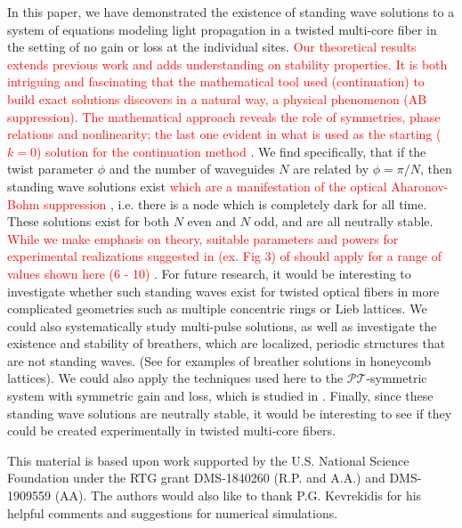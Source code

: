 \documentclass[reprint, amsmath,amssymb,aps,pra]{revtex4-2}
\newcommand{\revision}[1]{ \textcolor{red}{#1} }
\begin{document}
In this paper, we have demonstrated the existence of standing wave solutions to a system of equations modeling light propagation in a twisted multi-core fiber in the setting of no gain or loss at the individual sites. \revision{Our theoretical results extends previous work and adds understanding on stability properties. It is both intriguing and fascinating that the mathematical tool used (continuation) to build exact solutions discovers in a natural way, a physical phenomenon (AB suppression). The mathematical approach reveals the role of symmetries, phase relations and nonlinearity; the last one evident in what is used as the starting ($k=0$) solution for the continuation method}. We find specifically, that if the twist parameter $\phi$ and the number of waveguides $N$ are related by $\phi = \pi/N$, then standing wave solutions exist  \revision{which are a manifestation of the optical Aharonov-Bohm suppression}, i.e. there is a node which is completely dark for all time. These solutions exist for both $N$ even and $N$ odd, and are all neutrally stable.\revision{While we make emphasis on theory, suitable parameters and powers for experimental realizations suggested in (ex. Fig 3) of\cite{Parto2019} should apply for a range of values shown here (6 - 10)}. For future research, it would be interesting to investigate whether such standing waves exist for twisted optical fibers in more complicated geometries such as multiple concentric rings or Lieb lattices. We could also systematically study multi-pulse solutions, as well as investigate the existence and stability of breathers, which are localized, periodic structures that are not standing waves. (See \cite{Lumer2013} for examples of breather solutions in honeycomb lattices). We could also apply the techniques used here to the $\mathcal{PT}$-symmetric system with symmetric gain and loss, which is studied in \cite{castro2016}. Finally, since these standing wave solutions are neutrally stable, it would be interesting to see if they could be created experimentally in twisted multi-core fibers.

\begin{acknowledgments}
This material is based upon work supported by the U.S. National Science Foundation under the RTG grant DMS-1840260 (R.P. and A.A.) and DMS-1909559 (AA). The authors would also like to thank P.G. Kevrekidis for his helpful comments and suggestions for numerical simulations.
\end{acknowledgments}



\end{document}

